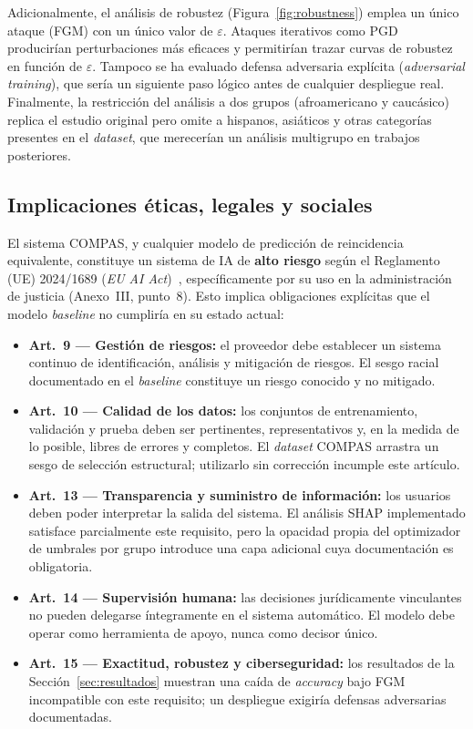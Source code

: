 \documentclass[11pt,a4paper]{article}
\begin{document}
Adicionalmente, el análisis de robustez (Figura~\ref{fig:robustness}) emplea un único ataque (FGM) con un único valor de $\varepsilon$. Ataques iterativos como PGD~\cite{madry2018towards} producirían perturbaciones más eficaces y permitirían trazar curvas de robustez en función de $\varepsilon$. Tampoco se ha evaluado defensa adversaria explícita (\textit{adversarial training}), que sería un siguiente paso lógico antes de cualquier despliegue real. Finalmente, la restricción del análisis a dos grupos (afroamericano y caucásico) replica el estudio original pero omite a hispanos, asiáticos y otras categorías presentes en el \textit{dataset}, que merecerían un análisis multigrupo en trabajos posteriores.

\subsection{Implicaciones éticas, legales y sociales}

El sistema COMPAS, y cualquier modelo de predicción de reincidencia equivalente, constituye un sistema de IA de \textbf{alto riesgo} según el Reglamento (UE) 2024/1689 (\textit{EU AI Act})~\cite{eu_ai_act_2024}, específicamente por su uso en la administración de justicia (Anexo~III, punto~8). Esto implica obligaciones explícitas que el modelo \textit{baseline} no cumpliría en su estado actual:

\begin{itemize}
    \item \textbf{Art.~9 --- Gestión de riesgos:} el proveedor debe establecer un sistema continuo de identificación, análisis y mitigación de riesgos. El sesgo racial documentado en el \textit{baseline} constituye un riesgo conocido y no mitigado.
    \item \textbf{Art.~10 --- Calidad de los datos:} los conjuntos de entrenamiento, validación y prueba deben ser pertinentes, representativos y, en la medida de lo posible, libres de errores y completos. El \textit{dataset} COMPAS arrastra un sesgo de selección estructural; utilizarlo sin corrección incumple este artículo.
    \item \textbf{Art.~13 --- Transparencia y suministro de información:} los usuarios deben poder interpretar la salida del sistema. El análisis SHAP implementado satisface parcialmente este requisito, pero la opacidad propia del optimizador de umbrales por grupo introduce una capa adicional cuya documentación es obligatoria.
    \item \textbf{Art.~14 --- Supervisión humana:} las decisiones jurídicamente vinculantes no pueden delegarse íntegramente en el sistema automático. El modelo debe operar como herramienta de apoyo, nunca como decisor único.
    \item \textbf{Art.~15 --- Exactitud, robustez y ciberseguridad:} los resultados de la Sección~\ref{sec:resultados} muestran una caída de \textit{accuracy} bajo FGM incompatible con este requisito; un despliegue exigiría defensas adversarias documentadas.
\end{itemize}
\end{document}
